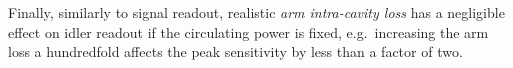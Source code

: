 Finally, similarly to signal readout, realistic \emph{arm intra-cavity loss} has a negligible effect on idler readout if the circulating power is fixed, e.g.\ increasing the arm loss a hundredfold affects the peak sensitivity by less than a factor of two. %


